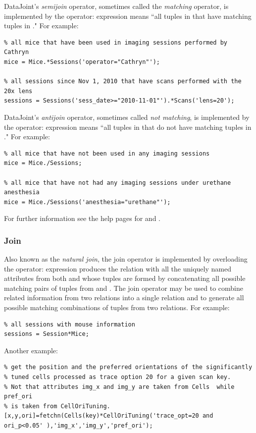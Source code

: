 \documentclass[10pt]{article}
\begin{document}
DataJoint's {\em semijoin} operator, sometimes called the {\em matching} operator,  is implemented by the  operator:  expression  means ``all tuples in  that have matching tuples in ." For example:
\begin{lstlisting}
% all mice that have been used in imaging sessions performed by Cathryn
mice = Mice.*Sessions('operator="Cathryn"');  

% all sessions since Nov 1, 2010 that have scans performed with the 20x lens
sessions = Sessions('sess_date>="2010-11-01"').*Scans('lens=20');
\end{lstlisting}

DataJoint's {\em antijoin} operator, sometimes called {\em not matching}, is implemented by the  operator: expression  means ``all tuples in  that do not have matching tuples in ." For example:

\begin{lstlisting}
% all mice that have not been used in any imaging sessions
mice = Mice./Sessions;

% all mice that have not had any imaging sessions under urethane anesthesia
mice = Mice./Sessions('anesthesia="urethane"');  
\end{lstlisting}

For further information see the help pages for  and .

\subsubsection{Join}\label{sec:join}
Also known as the {\em natural join}, the join operator is implemented by overloading the  operator: expression  produces the relation with all the uniquely named attributes from both  and  whose tuples are formed by concatenating all possible matching pairs of tuples from  and . The join operator may be used to combine related information from two relations into a single relation and to generate all possible matching combinations of tuples from two relations. For example:

\begin{lstlisting}
% all sessions with mouse information
sessions = Session*Mice;
\end{lstlisting}

Another example:
\begin{lstlisting}
% get the position and the preferred orientations of the significantly 
% tuned cells processed as trace option 20 for a given scan key.
% Not that attributes img_x and img_y are taken from Cells  while pref_ori 
% is taken from CellOriTuning. 
[x,y,ori]=fetchn(Cells(key)*CellOriTuning('trace_opt=20 and ori_p<0.05' ),'img_x','img_y','pref_ori');
\end{lstlisting} 
\end{document}
